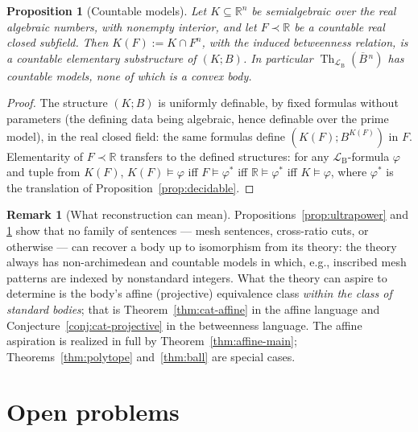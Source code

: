 \documentclass[11pt]{amsart}
\newtheorem{proposition}[theorem]{Proposition}
\theoremstyle{definition}
\newtheorem{remark}[theorem]{Remark}
\newcommand{\R}{\mathbb{R}}
\newcommand{\LB}{\mathcal{L}_{\mathrm{B}}}
\newcommand{\Th}{\operatorname{Th}}
\newcommand{\Ball}{\overline{B}{}^{\,n}}
\begin{document}
\begin{proposition}[Countable models]\label{prop:countable}
Let $K\subseteq\R^n$ be semialgebraic over the real algebraic numbers, with
nonempty interior, and let $F\prec\R$ be a countable real closed subfield.
Then $K(F):=K\cap F^n$, with the induced betweenness relation, is a
countable elementary substructure of $(K;B)$. In particular
$\Th_{\LB}(\Ball)$ has countable models, none of which is a convex body.
\end{proposition}

\begin{proof}
The structure $(K;B)$ is uniformly definable, by fixed formulas without
parameters (the defining data being algebraic, hence definable over the
prime model), in the real closed field: the same formulas define
$(K(F);B^{K(F)})$ in $F$. Elementarity of $F\prec\R$ transfers to the
defined structures: for any $\LB$-formula $\varphi$ and tuple from $K(F)$,
$K(F)\models\varphi$ iff $F\models\varphi^*$ iff $\R\models\varphi^*$ iff
$K\models\varphi$, where $\varphi^*$ is the translation of
Proposition~\ref{prop:decidable}.
\end{proof}

\begin{remark}[What reconstruction can mean]\label{rem:reconstruction}
Propositions~\ref{prop:ultrapower} and \ref{prop:countable} show that no
family of sentences --- mesh sentences, cross-ratio cuts, or otherwise --- can
recover a body up to isomorphism from its theory: the theory always has
non-archimedean and countable models in which, e.g., inscribed mesh patterns
are indexed by nonstandard integers. What the theory can aspire to determine
is the body's affine (projective) equivalence class \emph{within the class
of standard bodies}; that is Theorem~\ref{thm:cat-affine} in the affine
language and Conjecture~\ref{conj:cat-projective} in the betweenness language.
The affine aspiration is realized in full by Theorem~\ref{thm:affine-main};
Theorems~\ref{thm:polytope} and~\ref{thm:ball} are special cases.
\end{remark}

\section{Open problems}\label{sec:open}
\end{document}
